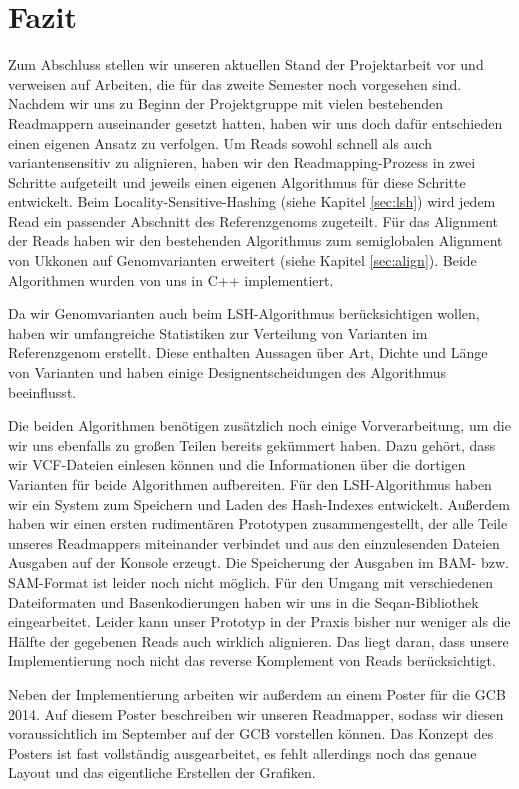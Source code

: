 \chapter{Fazit}
\label{sec:fazit}

Zum Abschluss stellen wir unseren aktuellen Stand der Projektarbeit vor und verweisen auf Arbeiten, die für das zweite Semester noch vorgesehen sind. Nachdem wir uns zu Beginn der Projektgruppe mit vielen bestehenden Readmappern auseinander gesetzt hatten, haben wir uns doch dafür entschieden einen eigenen Ansatz zu verfolgen. Um Reads sowohl schnell als auch variantensensitiv zu alignieren, haben wir den Readmapping-Prozess in zwei Schritte aufgeteilt und jeweils einen eigenen Algorithmus für diese Schritte entwickelt. Beim Locality-Sensitive-Hashing (siehe Kapitel \ref{sec:lsh}) wird jedem Read ein passender Abschnitt des Referenzgenoms zugeteilt. Für das Alignment der Reads haben wir den bestehenden Algorithmus zum semiglobalen Alignment von Ukkonen auf Genomvarianten erweitert (siehe Kapitel \ref{sec:align}). Beide Algorithmen wurden von uns in C++ implementiert.

Da wir Genomvarianten auch beim LSH-Algorithmus berücksichtigen wollen, haben wir umfangreiche Statistiken zur Verteilung von Varianten im Referenzgenom erstellt. Diese enthalten Aussagen über Art, Dichte und Länge von Varianten und haben einige Designentscheidungen des Algorithmus beeinflusst.

Die beiden Algorithmen benötigen zusätzlich noch einige Vorverarbeitung, um die wir uns ebenfalls zu großen Teilen bereits gekümmert haben. Dazu gehört, dass wir VCF-Dateien einlesen können und die Informationen über die dortigen Varianten für beide Algorithmen aufbereiten. Für den LSH-Algorithmus haben wir ein System zum Speichern und Laden des Hash-Indexes entwickelt. Außerdem haben wir einen ersten rudimentären Prototypen zusammengestellt, der alle Teile unseres Readmappers miteinander verbindet und aus den einzulesenden Dateien Ausgaben auf der Konsole erzeugt. Die Speicherung der Ausgaben im BAM- bzw. SAM-Format ist leider noch nicht möglich. Für den Umgang mit verschiedenen Dateiformaten und Basenkodierungen haben wir uns in die Seqan-Bibliothek eingearbeitet. Leider kann unser Prototyp in der Praxis bisher nur weniger als die Hälfte der gegebenen Reads auch wirklich alignieren. Das liegt daran, dass unsere Implementierung noch nicht das reverse Komplement von Reads berücksichtigt.

Neben der Implementierung arbeiten wir außerdem an einem Poster für die GCB 2014. Auf diesem Poster beschreiben wir unseren Readmapper, sodass wir diesen voraussichtlich im September auf der GCB vorstellen können. Das Konzept des Posters ist fast vollständig ausgearbeitet, es fehlt allerdings noch das genaue Layout und das eigentliche Erstellen der Grafiken.

